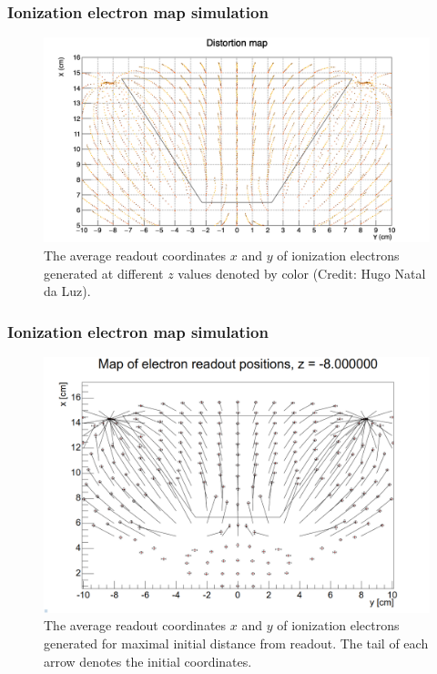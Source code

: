 \documentclass{beamer}
\begin{document}
	\begin{frame}
		\frametitle{Ionization electron map simulation}
		\begin{figure}
			\centering
			\includegraphics[height=0.6\textheight]{images/map_dist.png}
			\caption{The average readout coordinates $x$ and $y$ of ionization electrons generated at different $z$ values denoted by color (Credit: Hugo Natal da Luz).}
		\end{figure}
	\end{frame}
	\begin{frame}
		\frametitle{Ionization electron map simulation}
		\begin{figure}
			\centering
			\includegraphics[height=0.65\textheight]{images/map_dist2.png}
			\caption{The average readout coordinates $x$ and $y$ of ionization electrons generated for maximal initial distance from readout. The tail of each arrow denotes the initial coordinates.}
		\end{figure}
	\end{frame}
\end{document}

